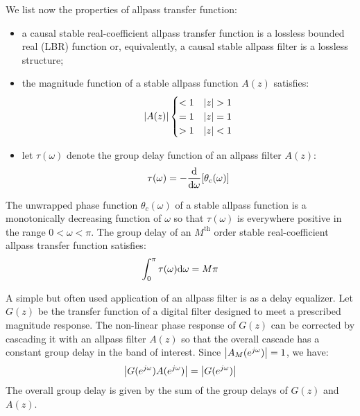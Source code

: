 \documentclass[../../main/main.tex]{subfiles}
\begin{document}
We list now the properties of allpass transfer function:
\begin{itemize}
    \item a causal stable real-coefficient allpass transfer function is a lossless bounded real (LBR) function or, equivalently, a causal stable allpass filter is a lossless structure;

    \item the magnitude function of a stable allpass function \( A(z) \) satisfies:
    \begin{equation}
        \abs{A(z)}
        \begin{cases}
            <1  &   \abs{z} > 1 \\
            =1  &   \abs{z} = 1 \\
            >1  &   \abs{z} < 1
        \end{cases}
        \label{eq:L17_S52_1}
    \end{equation}

    \item let \( \tau(\omega) \) denote the group delay function of an allpass filter \( A(z) \):
    \begin{equation}
        \tau(\omega)
        =
        - \dv{}{\omega} \qty[\theta_{c}(\omega)]
        \label{eq:L17_S52_2}
    \end{equation}
\end{itemize}

The unwrapped phase function \( \theta_{c}(\omega) \) of a stable allpass function is a monotonically decreasing function of \( \omega \) so that \( \tau(\omega) \) is everywhere positive in the range \( 0 < \omega < \pi \). The group delay of an \( M^{\text{th}} \) order stable real-coefficient allpass transfer function satisfies:
\begin{equation}
    \int_{0}^{\pi} \tau(\omega) \mathrm{d}{\omega}
    =
    M\pi
    \label{eq:L17_S53_1}
\end{equation}

A simple but often used application of an allpass filter is as a delay equalizer. Let \( G(z) \) be the transfer function of a digital filter designed to meet a prescribed magnitude response. The non-linear phase response of \( G(z) \) can be corrected by cascading it with an allpass filter \( A(z) \) so that the overall cascade has a constant group delay in the band of interest.
Since \( \abs{A_{M}(e^{j\omega})} = 1 \), we have:
\begin{equation}
    \abs{G(e^{j\omega}) A(e^{j\omega})}
    =
    \abs{G(e^{j\omega})}
    \label{eq:L17_S55_1}
\end{equation}
The overall group delay is given by the sum of the group delays of \( G(z) \) and \( A(z) \).
\end{document}
